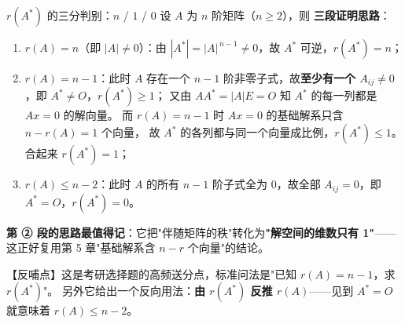 \begin{fdeep}{$r(A^{*})$ 的三分判别：$n$ / $1$ / $0$}
设 $A$ 为 $n$ 阶矩阵（$n\ge2$），则
\textbf{三段证明思路}：
\begin{enumerate}[leftmargin=2.2em,itemsep=0.25em]
\item $r(A)=n$（即 $|A|\ne0$）：由 $|A^{*}|=|A|^{\,n-1}\ne0$，故 $A^{*}$ 可逆，$r(A^{*})=n$；
\item $r(A)=n-1$：此时 $A$ 存在一个 $n-1$ 阶非零子式，故\textbf{至少有一个 $A_{ij}\ne0$}，即 $A^{*}\ne O$，$r(A^{*})\ge1$；
      又由 $AA^{*}=|A|E=O$ 知 $A^{*}$ 的每一列都是 $Ax=0$ 的解向量。
      而 $r(A)=n-1$ 时 $Ax=0$ 的基础解系只含 $n-r(A)=1$ 个向量，
      故 $A^{*}$ 的各列都与同一个向量成比例，$r(A^{*})\le1$。合起来 $r(A^{*})=1$；
\item $r(A)\le n-2$：此时 $A$ 的所有 $n-1$ 阶子式全为 $0$，故全部 $A_{ij}=0$，即 $A^{*}=O$，$r(A^{*})=0$。
\end{enumerate}
\textbf{第 ② 段的思路最值得记}：它把"伴随矩阵的秩"转化为\textbf{"解空间的维数只有 1"}\allowbreak——
这正好复用第 5 章"基础解系含 $n-r$ 个向量"的结论。

【反哺点】这是考研选择题的高频送分点，标准问法是"已知 $r(A)=n-1$，求 $r(A^{*})$"。
另外它给出一个反向用法：\textbf{由 $r(A^{*})$ 反推 $r(A)$}——见到 $A^{*}=O$ 就意味着 $r(A)\le n-2$。
\end{fdeep}

